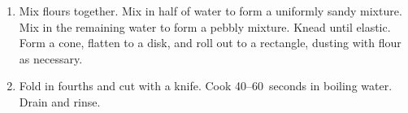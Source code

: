 
\begin{ingredients}
\end{ingredients}


\begin{recipe}
  \begin{enumerate}

  \item Mix flours together.  Mix in half of water to form a uniformly
    sandy mixture.  Mix in the remaining water to form a pebbly
    mixture.  Knead until elastic.  Form a cone, flatten to a disk,
    and roll out to a rectangle, dusting with flour as necessary.

  \item Fold in fourths and cut with a knife.  Cook 40--60~seconds in
    boiling water.  Drain and rinse.

  \end{enumerate}
\end{recipe}

